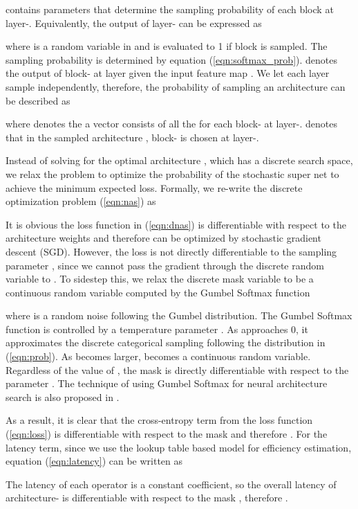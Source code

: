 \documentclass[10pt,twocolumn,letterpaper]{article}
\begin{document}
 contains parameters that determine the sampling probability of each block at layer-. Equivalently, the output of layer- can be expressed as

where  is a random variable in  and is evaluated to 1 if block  is sampled. The sampling probability is determined by equation (\ref{eqn:softmax_prob}).  denotes the output of block- at layer  given the input feature map . We let each layer sample independently, therefore, the probability of sampling an architecture  can be described as

where  denotes the a vector consists of all the  for each block- at layer-.  denotes that in the sampled architecture ,  block- is chosen at layer-. 

Instead of solving for the optimal architecture , which has a discrete search space, we relax the problem to optimize the probability  of the stochastic super net to achieve the minimum expected loss. Formally, we re-write the discrete optimization problem (\ref{eqn:nas}) as 

It is obvious the loss function in (\ref{eqn:dnas}) is differentiable with respect to the architecture weights  and therefore can be optimized by stochastic gradient descent (SGD). However, the loss is not directly differentiable to the sampling parameter , since we cannot pass the gradient through the discrete random variable  to . To sidestep this, we relax the discrete mask variable  to be a continuous random variable computed by the Gumbel Softmax function \cite{jang2016categorical, maddison2016concrete}

where  is a random noise following the Gumbel distribution. The Gumbel Softmax function is controlled by a temperature parameter . As  approaches 0, it approximates the discrete categorical sampling following the distribution in (\ref{eqn:prob}). As  becomes larger,  becomes a continuous random variable. Regardless of the value of , the mask  is directly differentiable with respect to the parameter . The technique of using Gumbel Softmax for neural architecture search is also proposed in \cite{wu2018mixed, anonymous2019snas:}.


As a result, it is clear that the cross-entropy term from the loss function (\ref{eqn:loss}) is differentiable with respect to the mask  and therefore . For the latency term, since we use the lookup table based model for efficiency estimation, equation (\ref{eqn:latency}) can be written as

The latency of each operator  is a constant coefficient, so the overall latency of architecture- is differentiable with respect to the mask , therefore . 
\end{document}
